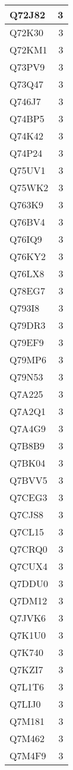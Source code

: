 \documentclass[
]{book}
\theoremstyle{definition}
\theoremstyle{definition}
\theoremstyle{definition}
\theoremstyle{definition}
\theoremstyle{remark}
\begin{document}
\begin{table}
\begin{tabular}{l|r}
\hline
Q72J82 & 3\\
\hline
Q72K30 & 3\\
\hline
Q72KM1 & 3\\
\hline
Q73PV9 & 3\\
\hline
Q73Q47 & 3\\
\hline
Q746J7 & 3\\
\hline
Q74BP5 & 3\\
\hline
Q74K42 & 3\\
\hline
Q74P24 & 3\\
\hline
Q75UV1 & 3\\
\hline
Q75WK2 & 3\\
\hline
Q763K9 & 3\\
\hline
Q76BV4 & 3\\
\hline
Q76IQ9 & 3\\
\hline
Q76KY2 & 3\\
\hline
Q76LX8 & 3\\
\hline
Q78EG7 & 3\\
\hline
Q793I8 & 3\\
\hline
Q79DR3 & 3\\
\hline
Q79EF9 & 3\\
\hline
Q79MP6 & 3\\
\hline
Q79N53 & 3\\
\hline
Q7A225 & 3\\
\hline
Q7A2Q1 & 3\\
\hline
Q7A4G9 & 3\\
\hline
Q7B8B9 & 3\\
\hline
Q7BK04 & 3\\
\hline
Q7BVV5 & 3\\
\hline
Q7CEG3 & 3\\
\hline
Q7CJS8 & 3\\
\hline
Q7CL15 & 3\\
\hline
Q7CRQ0 & 3\\
\hline
Q7CUX4 & 3\\
\hline
Q7DDU0 & 3\\
\hline
Q7DM12 & 3\\
\hline
Q7JVK6 & 3\\
\hline
Q7K1U0 & 3\\
\hline
Q7K740 & 3\\
\hline
Q7KZI7 & 3\\
\hline
Q7L1T6 & 3\\
\hline
Q7LIJ0 & 3\\
\hline
Q7M181 & 3\\
\hline
Q7M462 & 3\\
\hline
Q7M4F9 & 3\\

\end{tabular}
\end{table}
\end{document}
